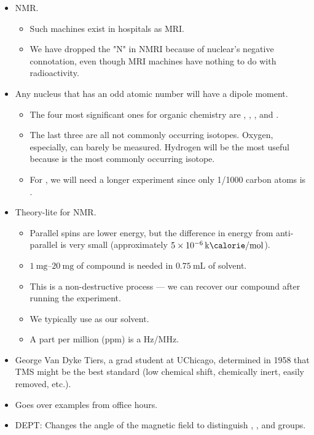 \documentclass[../notes.tex]{subfiles}
\begin{document}
\begin{itemize}
    \item NMR.
    \begin{itemize}
        \item Such machines exist in hospitals as MRI.
        \item We have dropped the "N" in NMRI because of nuclear's negative connotation, even though MRI machines have nothing to do with radioactivity.
    \end{itemize}
    \item Any nucleus that has an odd atomic number will have a dipole moment.
    \begin{itemize}
        \item The four most significant ones for organic chemistry are , , , and .
        \item The last three are all not commonly occurring isotopes. Oxygen, especially, can barely be measured. Hydrogen will be the most useful because  is the most commonly occurring isotope.
        \item For , we will need a longer experiment since only 1/1000 carbon atoms is .
    \end{itemize}
    \item Theory-lite for NMR.
    \begin{itemize}
        \item Parallel spins are lower energy, but the difference in energy from anti-parallel is very small (approximately $\SI[per-mode=symbol]{5e-6}{\kilo\calorie\per\mole}$).
        \item $\SIrange{1}{20}{\milli\gram}$ of compound is needed in $\SI{0.75}{\milli\liter}$ of solvent.
        \item This is a non-destructive process --- we can recover our compound after running the experiment.
        \item We typically use  as our solvent.
        \item A part per million (ppm) is a Hz/MHz.
    \end{itemize}
    \item George Van Dyke Tiers, a grad student at UChicago, determined in 1958 that TMS might be the best standard (low chemical shift, chemically inert, easily removed, etc.).
    \item Goes over examples from office hours.
    \item DEPT: Changes the angle of the magnetic field to distinguish , , and  groups.

\end{itemize}
\end{document}
